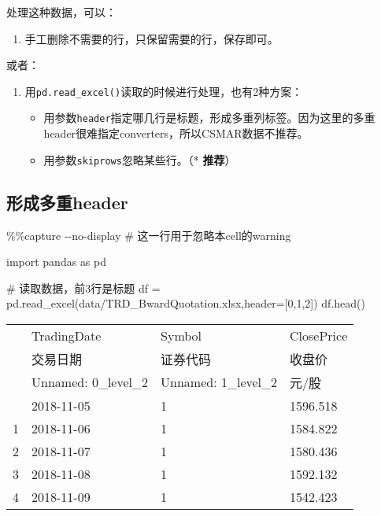 \documentclass[
  letterpaper,
  DIV=11,
  numbers=noendperiod]{scrreprt}
\newenvironment{Shaded}{\begin{snugshade}}{\end{snugshade}}
\newcommand{\CommentTok}[1]{\textcolor[rgb]{0.37,0.37,0.37}{#1}}
\newcommand{\DecValTok}[1]{\textcolor[rgb]{0.68,0.00,0.00}{#1}}
\newcommand{\ImportTok}[1]{\textcolor[rgb]{0.00,0.46,0.62}{#1}}
\newcommand{\NormalTok}[1]{\textcolor[rgb]{0.00,0.23,0.31}{#1}}
\newcommand{\OperatorTok}[1]{\textcolor[rgb]{0.37,0.37,0.37}{#1}}
\newcommand{\StringTok}[1]{\textcolor[rgb]{0.13,0.47,0.30}{#1}}
\providecommand{\tightlist}{%
  \setlength{\itemsep}{0pt}\setlength{\parskip}{0pt}}\usepackage{longtable,booktabs,array}
\begin{document}
处理这种数据，可以：

\begin{enumerate}
\def\labelenumi{\arabic{enumi}.}
\tightlist
\item
  手工删除不需要的行，只保留需要的行，保存即可。
\end{enumerate}

或者：

\begin{enumerate}
\def\labelenumi{\arabic{enumi}.}
\setcounter{enumi}{1}
\tightlist
\item
  用\texttt{pd.read\_excel()}读取的时候进行处理，也有2种方案：

  \begin{itemize}
  \tightlist
  \item
    用参数\texttt{header}指定哪几行是标题，形成多重列标签。因为这里的多重header很难指定converters，所以CSMAR数据不推荐。
  \item
    用参数\texttt{skiprows}忽略某些行。（* \textbf{推荐}）
  \end{itemize}
\end{enumerate}

\hypertarget{ux5f62ux6210ux591aux91cdheader}{%
\subsection{形成多重header}\label{ux5f62ux6210ux591aux91cdheader}}

\begin{Shaded}
\begin{Highlighting}[]
\OperatorTok{\%\%}\NormalTok{capture }\OperatorTok{{-}{-}}\NormalTok{no}\OperatorTok{{-}}\NormalTok{display }
\CommentTok{\# 这一行用于忽略本cell的warning}

\ImportTok{import}\NormalTok{ pandas }\ImportTok{as}\NormalTok{ pd}

\CommentTok{\# 读取数据，前3行是标题}
\NormalTok{df }\OperatorTok{=}\NormalTok{ pd.read\_excel(}\StringTok{\textquotesingle{}data/TRD\_BwardQuotation.xlsx\textquotesingle{}}\NormalTok{,header}\OperatorTok{=}\NormalTok{[}\DecValTok{0}\NormalTok{,}\DecValTok{1}\NormalTok{,}\DecValTok{2}\NormalTok{])}
\NormalTok{df.head()}
\end{Highlighting}
\end{Shaded}

\begin{longtable}[]{@{}llll@{}}
\toprule\noalign{}
& TradingDate & Symbol & ClosePrice \\
& 交易日期 & 证券代码 & 收盘价 \\
& Unnamed: 0\_level\_2 & Unnamed: 1\_level\_2 & 元/股 \\
\midrule\noalign{}
\endhead
\bottomrule\noalign{}
\endlastfoot
0 & 2018-11-05 & 1 & 1596.518 \\
1 & 2018-11-06 & 1 & 1584.822 \\
2 & 2018-11-07 & 1 & 1580.436 \\
3 & 2018-11-08 & 1 & 1592.132 \\
4 & 2018-11-09 & 1 & 1542.423 \\
\end{longtable}
\end{document}
